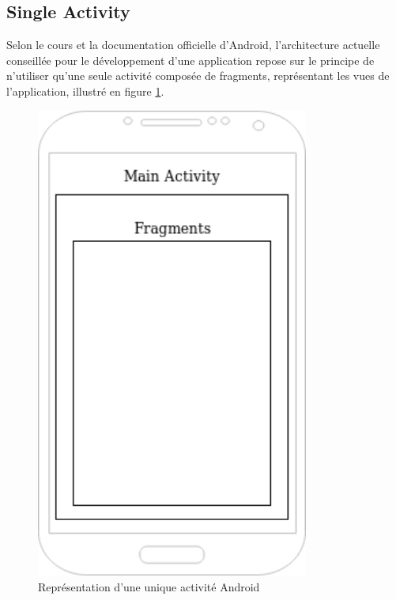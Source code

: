 \subsection{Single Activity}
Selon le cours et la documentation officielle d'Android, l'architecture actuelle conseillée pour le développement d'une application repose sur le principe de n'utiliser qu'une seule activité composée de fragments, représentant les vues de l'application, illustré en figure \ref{single_activity}.
\begin{figure}
    \begin{center}
        \includegraphics[width=0.8\textwidth]{img/schemas/Single_Activity.png}
    \end{center}
    \caption{Représentation d'une unique activité Android}
    \label{single_activity}
\end{figure}

